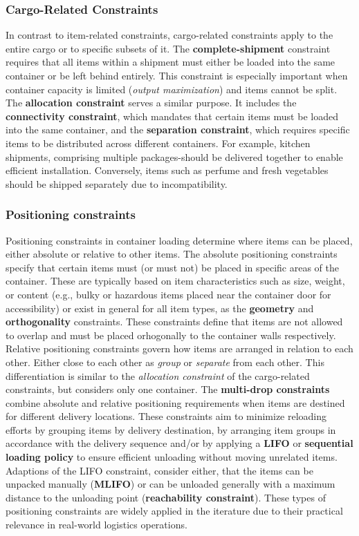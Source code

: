 \subsubsection{Cargo-Related Constraints}
In contrast to item-related constraints, cargo-related constraints apply to
the entire cargo or to specific subsets of it. The \textbf{complete-shipment} constraint
requires that all items within a shipment must either be loaded into the same
container or be left behind entirely. This constraint is especially important
when container capacity is limited (\textit{output maximization}) and items
cannot be split. The \textbf{allocation constraint} serves a similar purpose.
It includes the \textbf{connectivity constraint}, which mandates that
certain items must be loaded into the same container, and the
\textbf{separation constraint}, which requires specific items to
be distributed across different containers. For example, kitchen
shipments, comprising multiple packages-should be delivered together
to enable efficient installation. Conversely, items such as perfume and fresh
vegetables should be shipped separately due to incompatibility.

\subsubsection{Positioning constraints}

Positioning constraints in container loading determine where items can be placed,
either absolute or relative to other items. The absolute positioning constraints specify
that certain items
must (or must not) be placed in specific areas of the container. These are
typically based on item characteristics such as size, weight, or
content (e.g., bulky or hazardous items placed near the container door for accessibility) or
exist in general for all item types, as the \textbf{geometry} and
\textbf{orthogonality} constraints. These constraints define that items are not allowed to overlap
and must be placed orhogonally to the container walls respectively.
Relative positioning constraints govern how items are arranged in
relation to each other. Either close to each other as \textit{group} or
\textit{separate} from each other. This differentiation is similar to the
\textit{allocation constraint} of the cargo-related constraints, but considers
only one container.
The \textbf{multi-drop constraints} combine
absolute and relative positioning requirements when items are destined for
different delivery locations. These constraints aim to minimize reloading
efforts by grouping items by delivery destination, by arranging item groups
in accordance with the delivery sequence and/or by applying a
\textbf{\gls{LIFO}} or \textbf{sequential loading policy}
to ensure efficient unloading without moving unrelated items. Adaptions of the \gls{LIFO} constraint,
consider either, that the items can be unpacked manually (\textbf{\gls{MLIFO}}) or can be unloaded generally
with a maximum distance to the unloading point (\textbf{reachability constraint}). These
types of positioning constraints are widely applied in the iterature due
to their practical relevance in real-world logistics operations.

